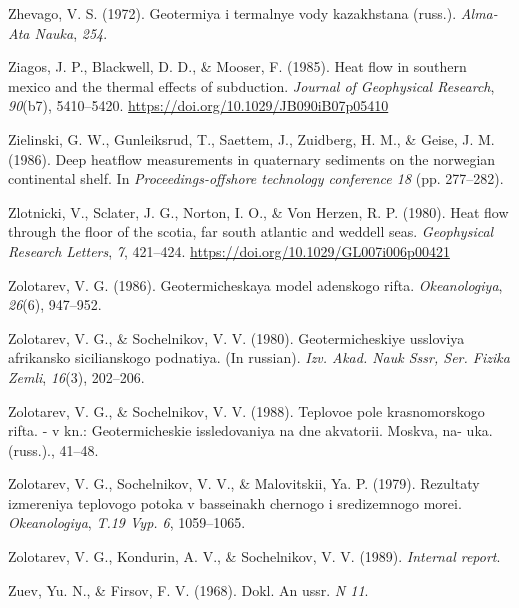 \begin{CSLReferences}{1}{1}
\leavevmode{}%
Zhevago, V. S. (1972). Geotermiya i termalnye vody kazakhstana (russ.). \emph{Alma-Ata Nauka}, \emph{254}.

\leavevmode{}%
Ziagos, J. P., Blackwell, D. D., \& Mooser, F. (1985). Heat flow in southern mexico and the thermal effects of subduction. \emph{Journal of Geophysical Research}, \emph{90}(b7), 5410--5420. \url{https://doi.org/10.1029/JB090iB07p05410}

\leavevmode{}%
Zielinski, G. W., Gunleiksrud, T., Saettem, J., Zuidberg, H. M., \& Geise, J. M. (1986). Deep heatflow measurements in quaternary sediments on the norwegian continental shelf. In \emph{Proceedings-offshore technology conference 18} (pp. 277--282).

\leavevmode{}%
Zlotnicki, V., Sclater, J. G., Norton, I. O., \& Von Herzen, R. P. (1980). Heat flow through the floor of the scotia, far south atlantic and weddell seas. \emph{Geophysical Research Letters}, \emph{7}, 421--424. \url{https://doi.org/10.1029/GL007i006p00421}

\leavevmode{}%
Zolotarev, V. G. (1986). Geotermicheskaya model adenskogo rifta. \emph{Okeanologiya}, \emph{26}(6), 947--952.

\leavevmode{}%
Zolotarev, V. G., \& Sochelnikov, V. V. (1980). Geotermicheskiye ussloviya afrikansko sicilianskogo podnatiya. (In russian). \emph{Izv. Akad. Nauk Sssr, Ser. Fizika Zemli}, \emph{16}(3), 202--206.

\leavevmode{}%
Zolotarev, V. G., \& Sochelnikov, V. V. (1988). Teplovoe pole krasnomorskogo rifta. - v kn.: Geotermicheskie issledovaniya na dne akvatorii. Moskva, na- uka. (russ.)., 41--48.

\leavevmode{}%
Zolotarev, V. G., Sochelnikov, V. V., \& Malovitskii, Ya. P. (1979). Rezultaty izmereniya teplovogo potoka v basseinakh chernogo i sredizemnogo morei. \emph{Okeanologiya}, \emph{T.19 Vyp. 6}, 1059--1065.

\leavevmode{}%
Zolotarev, V. G., Kondurin, A. V., \& Sochelnikov, V. V. (1989). \emph{Internal report}.

\leavevmode{}%
Zuev, Yu. N., \& Firsov, F. V. (1968). Dokl. An ussr. \emph{N 11}.


\end{CSLReferences}

